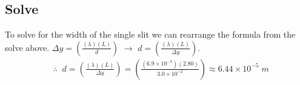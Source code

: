 \documentclass{article}
\begin{document}
\subsection*{Solve}
To solve for the width of the single slit we can rearrange the formula from the solve above. $\Delta y = \left(\frac{(\lambda)(L)}{d}\right)$ $\to$ $d = \left(\frac{(\lambda)(L)}{\Delta y}\right)$.\\
\begin{align*}
     & \therefore\;\;d = \left(\frac{(\lambda)(L)}{\Delta y}\right) = \left(\frac{(6.9 \times 10^{-7})(2.80)}{3.0 \times 10^{-2}}\right) \approx 6.44 \times 10^{-5}\;m
\end{align*}\leavevmode\\
\end{document}
